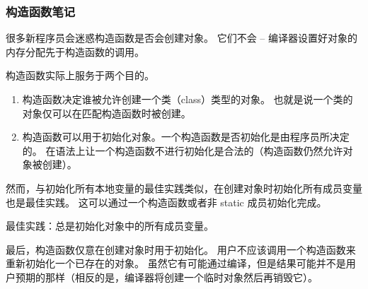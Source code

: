 \documentclass[../../LearnCpp.tex]{subfiles}
\begin{document}
\subsubsection*{构造函数笔记}

很多新程序员会迷惑构造函数是否会创建对象。
它们不会 -- 编译器设置好对象的内存分配先于构造函数的调用。

构造函数实际上服务于两个目的。

\begin{enumerate}
    \item 构造函数决定谁被允许创建一个类（class）类型的对象。
          也就是说一个类的对象仅可以在匹配构造函数时被创建。
    \item 构造函数可以用于初始化对象。一个构造函数是否初始化是由程序员所决定的。
          在语法上让一个构造函数不进行初始化是合法的（构造函数仍然允许对象被创建）。
\end{enumerate}

然而，与初始化所有本地变量的最佳实践类似，在创建对象时初始化所有成员变量也是最佳实践。
这可以通过一个构造函数或者非 static 成员初始化完成。

最佳实践：总是初始化对象中的所有成员变量。

最后，构造函数仅意在创建对象时用于初始化。
用户不应该调用一个构造函数来重新初始化一个已存在的对象。
虽然它有可能通过编译，但是结果可能并不是用户预期的那样（相反的是，编译器将创建一个临时对象然后再销毁它）。
\end{document}
